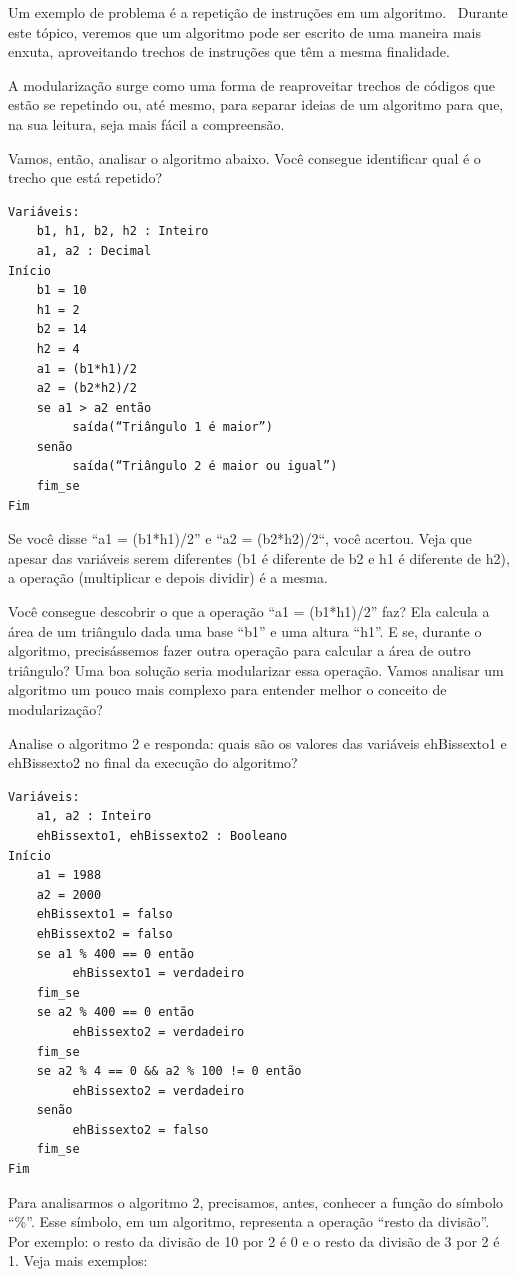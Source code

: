 \documentclass[11pt]{article}
\begin{document}
Um exemplo de problema é a repetição de instruções em um algoritmo.  Durante este tópico, veremos que um algoritmo pode ser escrito de uma maneira mais enxuta, aproveitando trechos de instruções que têm a mesma finalidade.

A modularização surge como uma forma de reaproveitar trechos de códigos que estão se repetindo ou, até mesmo, para separar ideias de um algoritmo para que, na sua leitura, seja mais fácil a compreensão.

Vamos, então, analisar o algoritmo abaixo. Você consegue identificar qual é o trecho que está repetido?

\begin{verbatim}
Variáveis:
    b1, h1, b2, h2 : Inteiro
    a1, a2 : Decimal
Início
    b1 = 10
    h1 = 2
    b2 = 14
    h2 = 4
    a1 = (b1*h1)/2
    a2 = (b2*h2)/2
    se a1 > a2 então
         saída(“Triângulo 1 é maior”)
    senão
         saída(“Triângulo 2 é maior ou igual”)
    fim_se
Fim
\end{verbatim}

Se você disse “a1 = (b1*h1)/2” e “a2 = (b2*h2)/2“, você acertou. Veja que apesar das variáveis serem diferentes (b1 é diferente de b2 e h1 é diferente de h2), a operação (multiplicar e depois dividir) é a mesma.

Você consegue descobrir o que a operação “a1 = (b1*h1)/2” faz? Ela calcula a área de um triângulo dada uma base “b1” e uma altura “h1”. E se, durante o algoritmo, precisássemos fazer outra operação para calcular a área de outro triângulo? Uma boa solução seria modularizar essa operação. Vamos analisar um algoritmo um pouco mais complexo para entender melhor o conceito de modularização?

Analise o algoritmo 2 e responda: quais são os valores das variáveis ehBissexto1 e ehBissexto2 no final da execução do algoritmo?

\begin{verbatim}
Variáveis:
    a1, a2 : Inteiro
    ehBissexto1, ehBissexto2 : Booleano
Início
    a1 = 1988
    a2 = 2000
    ehBissexto1 = falso
    ehBissexto2 = falso
    se a1 % 400 == 0 então
         ehBissexto1 = verdadeiro
    fim_se
    se a2 % 400 == 0 então
         ehBissexto2 = verdadeiro
    fim_se
    se a2 % 4 == 0 && a2 % 100 != 0 então
         ehBissexto2 = verdadeiro
    senão
         ehBissexto2 = falso
    fim_se
Fim
\end{verbatim}

Para analisarmos o algoritmo 2, precisamos, antes, conhecer a função do símbolo “\%”. Esse símbolo, em um algoritmo, representa a operação “resto da divisão”. Por exemplo: o resto da divisão de 10 por 2 é 0 e o resto da divisão de 3 por 2 é 1. Veja mais exemplos:
\end{document}
